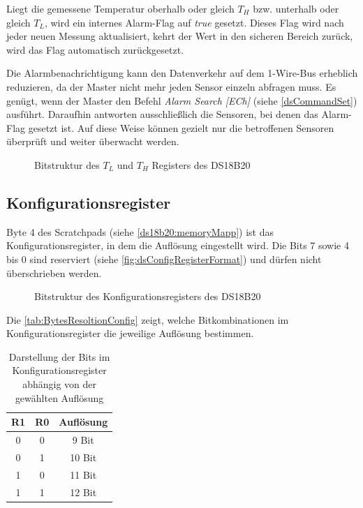 Liegt die gemessene Temperatur oberhalb oder gleich $T_H$ bzw. unterhalb oder gleich $T_L$, wird ein internes Alarm-Flag auf \textit{true} gesetzt. 
Dieses Flag wird nach jeder neuen Messung aktualisiert, kehrt der Wert in den sicheren Bereich zurück, wird das Flag automatisch zurückgesetzt. 

Die Alarmbenachrichtigung kann den Datenverkehr auf dem 1-Wire-Bus erheblich reduzieren, da der Master nicht mehr jeden Sensor einzeln abfragen muss. 
Es genügt, wenn der Master den Befehl \textit{Alarm Search [ECh]} (siehe \autoref{dsCommandSet}) ausführt. 
Daraufhin antworten ausschlie{\ss}lich die Sensoren, bei denen das Alarm-Flag gesetzt ist. 
Auf diese Weise können gezielt nur die betroffenen Sensoren überprüft und weiter überwacht werden.

\begin{figure}[H]
	\centering
	\resizebox{\textwidth}{!}{%
		\fbox{
			\begin{tikzpicture}
				\dsAlarmRegisterFormat
			\end{tikzpicture}%
		}
	}
	\caption{Bitstruktur des $T_L$ und $T_H$ Registers des DS18B20}
	\label{fig:dsAlarmRegisterFormat}
\end{figure}

\subsection{Konfigurationsregister}
	Byte 4 des Scratchpads (siehe \autoref{ds18b20:memoryMapp}) ist das Konfigurationsregister, in dem die Auflösung eingestellt wird. Die Bits 7 sowie 4 bis 0 sind reserviert (siehe \autoref{fig:dsConfigRegisterFormat}) und dürfen nicht überschrieben werden.
	
	\begin{figure}[H]
		\centering
		\resizebox{\textwidth}{!}{%
			\fbox{
				\begin{tikzpicture}
					\dsConfigRegisterFormat
				\end{tikzpicture}%
			}
		}
		\caption{Bitstruktur des Konfigurationsregisters des DS18B20}
		\label{fig:dsConfigRegisterFormat}
	\end{figure}
	
	Die \autoref{tab:BytesResoltionConfig} zeigt, welche Bitkombinationen im Konfigurationsregister die jeweilige Auflösung bestimmen.

	\begin{table}[H]
		\centering
		\begin{tabular}{|c|c|c|}
			\hline
			\textbf{R1} & \textbf{R0} & \textbf{Auflösung} \\
			\hline
			0 & 0 & 9 Bit\\
			\hline
			0 & 1 & 10 Bit\\
			\hline
			1 & 0 & 11 Bit\\
			\hline
			1 & 1 & 12 Bit\\
			\hline
		\end{tabular}
		\caption{Darstellung der Bits im Konfigurationsregister abhängig von der gewählten Auflösung}
		\label{tab:BytesResoltionConfig}
	\end{table}
	
